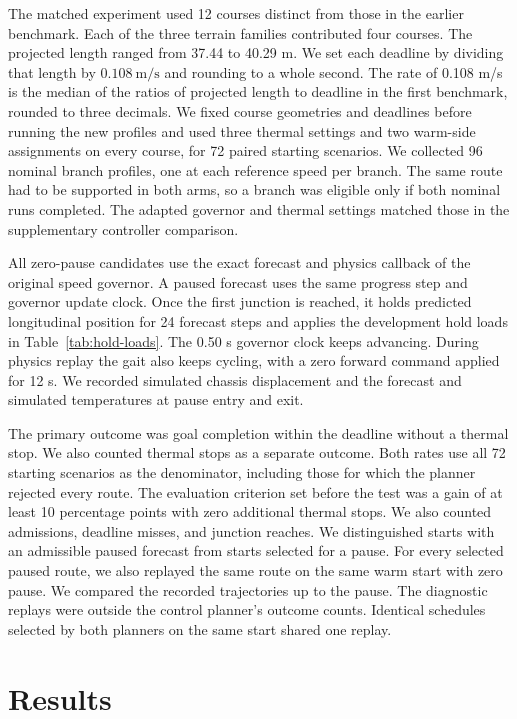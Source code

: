 \documentclass{ieeeaccess}
\begin{document}
The matched experiment used 12 courses distinct from those in the earlier benchmark. Each of the three terrain families contributed four courses. The projected length ranged from 37.44 to 40.29 m. We set each deadline by dividing that length by $0.108~\mathrm{m/s}$ and rounding to a whole second. The rate of 0.108 m/s is the median of the ratios of projected length to deadline in the first benchmark, rounded to three decimals. We fixed course geometries and deadlines before running the new profiles and used three thermal settings and two warm-side assignments on every course, for 72 paired starting scenarios. We collected 96 nominal branch profiles, one at each reference speed per branch. The same route had to be supported in both arms, so a branch was eligible only if both nominal runs completed. The adapted governor and thermal settings matched those in the supplementary controller comparison.

All zero-pause candidates use the exact forecast and physics callback of the original speed governor. A paused forecast uses the same progress step and governor update clock. Once the first junction is reached, it holds predicted longitudinal position for 24 forecast steps and applies the development hold loads in Table~\ref{tab:hold-loads}. The 0.50 s governor clock keeps advancing. During physics replay the gait also keeps cycling, with a zero forward command applied for 12 s. We recorded simulated chassis displacement and the forecast and simulated temperatures at pause entry and exit.

The primary outcome was goal completion within the deadline without a thermal stop. We also counted thermal stops as a separate outcome. Both rates use all 72 starting scenarios as the denominator, including those for which the planner rejected every route. The evaluation criterion set before the test was a gain of at least 10 percentage points with zero additional thermal stops. We also counted admissions, deadline misses, and junction reaches. We distinguished starts with an admissible paused forecast from starts selected for a pause. For every selected paused route, we also replayed the same route on the same warm start with zero pause. We compared the recorded trajectories up to the pause. The diagnostic replays were outside the control planner's outcome counts. Identical schedules selected by both planners on the same start shared one replay.

\section{Results}
\end{document}
